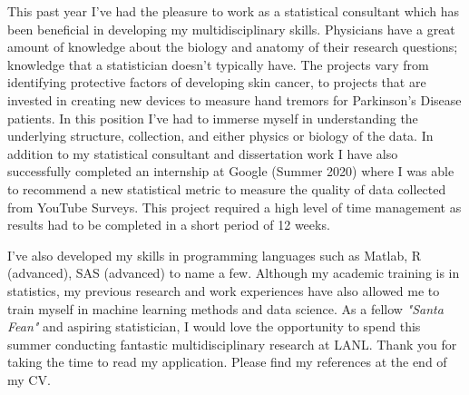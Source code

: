 \documentclass[11pt, a4paper]{awesome-cv}
\begin{document}
\begin{cvletter}
This past year I've had the pleasure to work as a statistical consultant which has been beneficial in developing my multidisciplinary skills. Physicians have a great amount of knowledge about the biology and anatomy of their research questions; knowledge that a statistician doesn't typically have. The projects vary from identifying protective factors of developing skin cancer, to projects that are invested in creating new devices to measure hand tremors for Parkinson's Disease patients. In this position I've had to immerse myself in understanding the underlying structure, collection, and either physics or biology of the data. In addition to my statistical consultant and dissertation work I have also successfully completed an internship at Google (Summer 2020) where I was able to recommend a new statistical metric to measure the quality of data collected from YouTube Surveys. This project required a high level of time management as results had to be completed in a short period of 12 weeks.

I've also developed my skills in programming languages such as Matlab, R (advanced), SAS (advanced) to name a few. Although my academic training is in statistics, my previous research and work experiences have also allowed me to train myself in machine learning methods and data science. As a fellow {\it "Santa Fean"} and aspiring statistician, I would love the opportunity to spend this summer conducting fantastic multidisciplinary research at LANL. Thank you for taking the time to read my application. Please find my references at the end of my CV.

\end{cvletter}


\makeletterclosing
\end{document}
